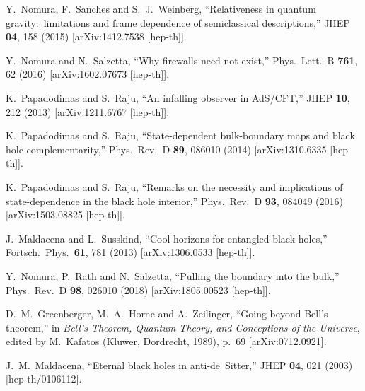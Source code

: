 \documentclass[12pt]{article}
\begin{document}
\begin{thebibliography}{99}
Y.~Nomura, F.~Sanches and S.~J.~Weinberg,
``Relativeness in quantum gravity:\ limitations and frame dependence of semiclassical descriptions,''
JHEP {\bf 04}, 158 (2015)
[arXiv:1412.7538 [hep-th]].

Y.~Nomura and N.~Salzetta,
``Why firewalls need not exist,''
Phys.\ Lett.\ B {\bf 761}, 62 (2016)
[arXiv:1602.07673 [hep-th]].

K.~Papadodimas and S.~Raju,
``An infalling observer in AdS/CFT,''
JHEP {\bf 10}, 212 (2013)
[arXiv:1211.6767 [hep-th]].

K.~Papadodimas and S.~Raju,
``State-dependent bulk-boundary maps and black hole complementarity,''
Phys.\ Rev.\ D {\bf 89}, 086010 (2014)
[arXiv:1310.6335 [hep-th]].

K.~Papadodimas and S.~Raju,
``Remarks on the necessity and implications of state-dependence in the black hole interior,''
Phys.\ Rev.\ D {\bf 93}, 084049 (2016)
[arXiv:1503.08825 [hep-th]].

J.~Maldacena and L.~Susskind,
``Cool horizons for entangled black holes,''
Fortsch.\ Phys.\ {\bf 61}, 781 (2013)
[arXiv:1306.0533 [hep-th]].

Y.~Nomura, P.~Rath and N.~Salzetta,
``Pulling the boundary into the bulk,''
Phys.\ Rev.\ D {\bf 98}, 026010 (2018)
[arXiv:1805.00523 [hep-th]].

D.~M.~Greenberger, M.~A.~Horne and A.~Zeilinger,
``Going beyond Bell's theorem,''
in {\it Bell's Theorem, Quantum Theory, and Conceptions of 
the Universe},
edited by M.~Kafatos
(Kluwer, Dordrecht, 1989), p.~69
[arXiv:0712.0921].

J.~M.~Maldacena,
``Eternal black holes in anti-de~Sitter,''
JHEP {\bf 04}, 021 (2003)
[hep-th/0106112].


\end{thebibliography}
\end{document}
